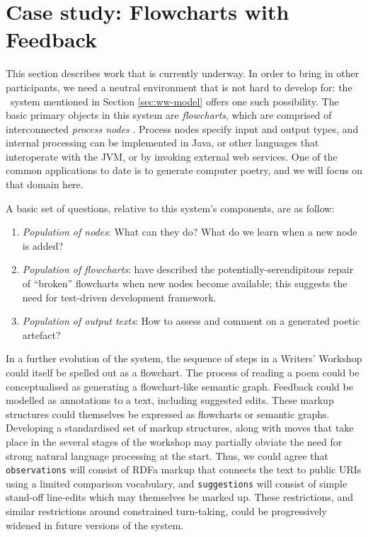 \section{Case study: Flowcharts with Feedback} \label{sec:implementation}

This section describes work that is currently underway.  In order to
bring in other participants, we need a neutral environment that is not
hard to develop for: the \Fw\ system mentioned in Section
\ref{sec:ww-model} offers one such possibility.  The basic primary
objects in this system are \emph{flowcharts}, which are comprised of
interconnected \emph{process nodes}
\cite{charnley2014flowr,colton-flowcharting}.  Process nodes specify
input and output types, and internal processing can be implemented in
Java, or other languages that interoperate with the JVM, or by
invoking external web services.  One of the common applications to
date is to generate computer poetry, and we will focus on that domain
here.

A basic set of questions, relative to this system's components, are as 
follow:
\begin{enumerate}
\item \emph{Population of nodes}: What can they do?  What do we learn
  when a new node is added?
\item \emph{Population of flowcharts}: 
  have described the potentially-serendipitous repair of ``broken''
  flowcharts when new nodes become available; this suggests the need for
  test-driven development framework.
\item \emph{Population of output texts}: How to assess and comment on
  a generated poetic artefact?
\end{enumerate}

In a further evolution of the system, the sequence of steps in a
Writers' Workshop could itself be spelled out as a flowchart.  The
process of reading a poem could be conceptualised as generating a
flowchart-like semantic graph.  Feedback could be modelled as
annotations to a text, including suggested edits.  These markup
structures could themselves be expressed as flowcharts or semantic
graphs.  Developing a standardised set of markup structures, along
with moves that take place in the several stages of the workshop may
partially obviate the need for strong natural language processing at
the start.  Thus, we could agree that {\tt observations} will consist
of RDFa markup that connects the text to public URIs using a limited
comparison vocabulary, and {\tt suggestions} will consist of simple
stand-off line-edits which may themselves be marked up.  These
restrictions, and similar restrictions around constrained turn-taking,
could be progressively widened in future versions of the system.

